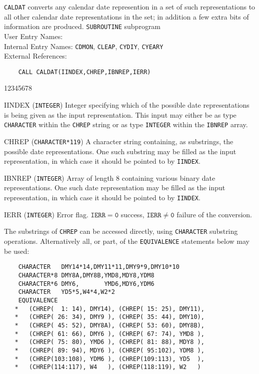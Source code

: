                             
                             
\Submitter{}                                 
{\tt CALDAT} converts any calendar date represention in a set of
such representations to all other calendar date representations in
the set; in addition a few extra bits of information are produced.
\Structure
{\tt SUBROUTINE} subprogram \\
User Entry Names: \\
Internal Entry Names: {\tt CDMON}, {\tt CLEAP}, {\tt CYDIY},
{\tt CYEARY}\\
External References: 
\Usage
\begin{verbatim}
    CALL CALDAT(IINDEX,CHREP,IBNREP,IERR)
\end{verbatim}
\begin{DLtt}{12345678}
\item [IINDEX] ({\tt INTEGER}) Integer specifying which of the possible
date representations is being given as the input representation. This
input may either be as type {\tt CHARACTER} within the {\tt CHREP}
string or as type {\tt INTEGER} within the {\tt IBNREP} array.
\item [CHREP] ({\tt CHARACTER*119}) A character string containing,
as substrings, the possible date representations. One such substring may
be filled as the input representation, in which case it should be pointed
to by {\tt IINDEX}.
\item [IBNREP] ({\tt INTEGER}) Array of length 8 containing various
binary date representations. One such date representation may be filled
as the input representation, in which case it should be pointed to by
{\tt IINDEX}.
\item [IERR] ({\tt INTEGER}) Error flag. $\mathtt{IERR=0}$ success,
$\mathtt{IERR \neq 0}$ failure of the conversion.
\end{DLtt}
The substrings of {\tt CHREP} can be accessed directly,
using {\tt CHARACTER} substring operations. Alternatively all, or part,
of the {\tt EQUIVALENCE} statements below may be used:
\begin{verbatim}
    CHARACTER   DMY14*14,DMY11*11,DMY9*9,DMY10*10
    CHARACTER*8 DMY8A,DMY8B,YMD8,MDY8,YDM8
    CHARACTER*6 DMY6,       YMD6,MDY6,YDM6
    CHARACTER   YD5*5,W4*4,W2*2
    EQUIVALENCE
   *   (CHREP(  1: 14), DMY14), (CHREP( 15: 25), DMY11),
   *   (CHREP( 26: 34), DMY9 ), (CHREP( 35: 44), DMY10),
   *   (CHREP( 45: 52), DMY8A), (CHREP( 53: 60), DMY8B),
   *   (CHREP( 61: 66), DMY6 ), (CHREP( 67: 74), YMD8 ),
   *   (CHREP( 75: 80), YMD6 ), (CHREP( 81: 88), MDY8 ),
   *   (CHREP( 89: 94), MDY6 ), (CHREP( 95:102), YDM8 ),
   *   (CHREP(103:108), YDM6 ), (CHREP(109:113), YD5  ),
   *   (CHREP(114:117), W4   ), (CHREP(118:119), W2   )
\end{verbatim}
